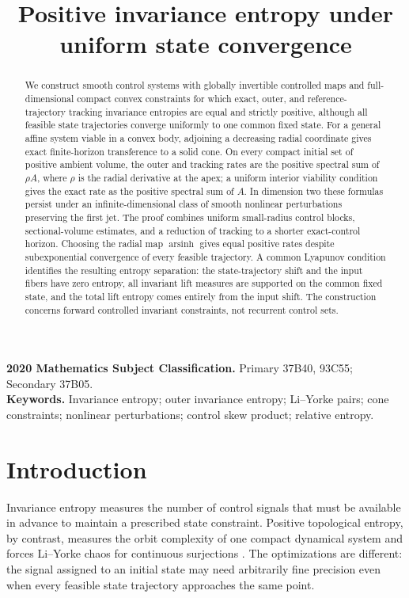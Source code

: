 \documentclass[11pt,a4paper]{article}
\title{Positive invariance entropy under\\uniform state convergence}
\author{}
\date{}
\theoremstyle{definition}
\theoremstyle{remark}
\begin{document}
\maketitle
\begin{abstract}
We construct smooth control systems with globally invertible controlled maps and full-dimensional compact convex constraints for which exact, outer, and reference-trajectory tracking invariance entropies are equal and strictly positive, although all feasible state trajectories converge uniformly to one common fixed state. For a general affine system viable in a convex body, adjoining a decreasing radial coordinate gives exact finite-horizon transference to a solid cone. On every compact initial set of positive ambient volume, the outer and tracking rates are the positive spectral sum of \(\rho A\), where \(\rho\) is the radial derivative at the apex; a uniform interior viability condition gives the exact rate as the positive spectral sum of \(A\). In dimension two these formulas persist under an infinite-dimensional class of smooth nonlinear perturbations preserving the first jet. The proof combines uniform small-radius control blocks, sectional-volume estimates, and a reduction of tracking to a shorter exact-control horizon. Choosing the radial map \(\operatorname{arsinh}\) gives equal positive rates despite subexponential convergence of every feasible trajectory. A common Lyapunov condition identifies the resulting entropy separation: the state-trajectory shift and the input fibers have zero entropy, all invariant lift measures are supported on the common fixed state, and the total lift entropy comes entirely from the input shift. The construction concerns forward controlled invariant constraints, not recurrent control sets.
\end{abstract}
\noindent\textbf{2020 Mathematics Subject Classification.} Primary 37B40, 93C55; Secondary 37B05.\\
\textbf{Keywords.} Invariance entropy; outer invariance entropy; Li--Yorke pairs; cone constraints; nonlinear perturbations; control skew product; relative entropy.

\section{Introduction}

Invariance entropy measures the number of control signals that must be available in advance to maintain a prescribed state constraint. Positive topological entropy, by contrast, measures the orbit complexity of one compact dynamical system and forces Li--Yorke chaos for continuous surjections \cite{BGKM}. The optimizations are different: the signal assigned to an initial state may need arbitrarily fine precision even when every feasible state trajectory approaches the same point.
\end{document}
